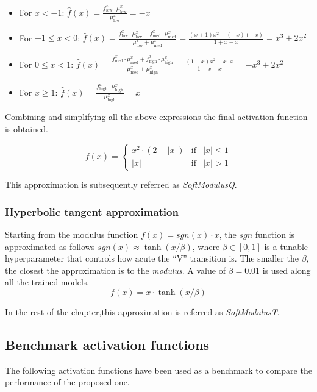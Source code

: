 \begin{itemize}
	\item For $x < -1$:  $\hat{f}(x)=\frac{f^x_{\text{low}} \cdot \mu^x_{\text{low}}}{\mu^x_{\text{low}}}=-x$

	\item For $-1\leq x < 0$:  $\hat{f}(x)=\frac{f^x_{\text{low}} \cdot \mu^x_{\text{low}} + f^x_{\text{med}} \cdot \mu^x_{\text{med}}}{\mu^x_{\text{low}} + \mu^x_{\text{med}}}=\frac{(x+1)x^2+(-x)(-x)}{1+x-x}=x^3 + 2x^2$

	\item For $0\leq x < 1$:  $\hat{f}(x)=\frac{f^x_{\text{med}} \cdot \mu^x_{\text{med}} + f^x_{\text{high}} \cdot \mu^x_{\text{high}}}{\mu^x_{\text{med}} + \mu^x_{\text{high}}}=\frac{(1-x)x^2+x\cdot x}{1-x+x}=-x^3 + 2x^2$

	\item For $x \geq 1$:  $\hat{f}(x)=\frac{f^x_{\text{high}} \cdot \mu^x_{\text{high}}}{\mu^x_{\text{high}}}=x$
\end{itemize}

Combining and simplifying all the above expressions the final activation function is obtained.

$$
f(x)= \left\{ \begin{array}{lcc}
x^2 \cdot (2-|x|) &  \text{if} & |x| \leq 1 \\
|x| &   \text{if}  & |x| > 1
\end{array}
\right.
$$

This approximation is subsequently referred as \textit{SoftModulusQ}.

\subsubsection{Hyperbolic tangent approximation}
Starting from the modulus function $f(x)=sgn(x)\cdot x$, the $sgn$ function is approximated as follows $sgn(x) \approx \tanh(x/\beta)$, where $\beta \in [0, 1]$ is a tunable hyperparameter that controls how acute the ``V'' transition is. The smaller the $\beta$, the closest the approximation is to the \textit{modulus}. A value of $\beta=0.01$ is used along all the trained models.
	$$f(x) = x \cdot \tanh(x/\beta)$$

In the rest of the chapter,this approximation is referred as \textit{SoftModulusT}.


\subsection{Benchmark activation functions}
The following activation functions have been used as a benchmark to compare the performance of the proposed one.


